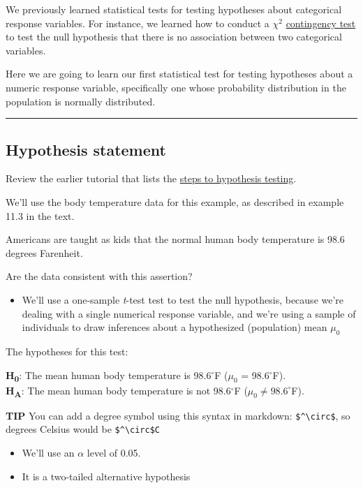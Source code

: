 \documentclass[
]{book}
\providecommand{\tightlist}{%
  \setlength{\itemsep}{0pt}\setlength{\parskip}{0pt}}
\begin{document}
We previously learned statistical tests for testing hypotheses about categorical response variables. For instance, we learned how to conduct a \(\chi^2\) \hyperref[chisquare]{contingency test} to test the null hypothesis that there is no association between two categorical variables.

Here we are going to learn our first statistical test for testing hypotheses about a numeric response variable, specifically one whose probability distribution in the population is normally distributed.

\begin{center}\rule{0.5\linewidth}{0.5pt}\end{center}

\subsection{Hypothesis statement}\label{onesamp_hyp}

Review the earlier tutorial that lists the \hyperref[hyp_steps]{steps to hypothesis testing}.

We'll use the body temperature data for this example, as described in example 11.3 in the text.

Americans are taught as kids that the normal human body temperature is 98.6 degrees Farenheit.

Are the data consistent with this assertion?

\begin{itemize}
\tightlist
\item
  We'll use a one-sample \emph{t}-test test to test the null hypothesis, because we're dealing with a single numerical response variable, and we're using a sample of individuals to draw inferences about a hypothesized (population) mean \(\mu_0\)
\end{itemize}

The hypotheses for this test:

\textbf{H\textsubscript{0}}: The mean human body temperature is 98.6\(^\circ\)F (\(\mu_0\) = 98.6\(^\circ\)F).\\
\textbf{H\textsubscript{A}}: The mean human body temperature is not 98.6\(^\circ\)F (\(\mu_0 \ne 98.6^\circ\)F).

\textbf{TIP }
You can add a degree symbol using this syntax in markdown: \texttt{\$\^{}\textbackslash{}circ\$}, so degrees Celsius would be \texttt{\$\^{}\textbackslash{}circ\$C}

\begin{itemize}
\tightlist
\item
  We'll use an \(\alpha\) level of 0.05.\\
\item
  It is a two-tailed alternative hypothesis
\end{itemize}
\end{document}
